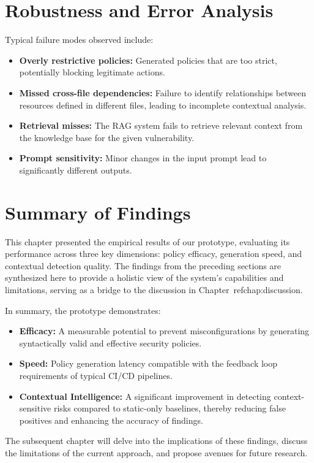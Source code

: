 \section{Robustness and Error Analysis}\label{sec:robustness-error}

Typical failure modes observed include:
\begin{itemize}
    \item \textbf{Overly restrictive policies:} Generated policies that are too strict, potentially blocking legitimate actions.
    \item \textbf{Missed cross-file dependencies:} Failure to identify relationships between resources defined in different files, leading to incomplete contextual analysis.
    \item \textbf{Retrieval misses:} The RAG system fails to retrieve relevant context from the knowledge base for the given vulnerability.
    \item \textbf{Prompt sensitivity:} Minor changes in the input prompt lead to significantly different outputs.
\end{itemize}

\section{Summary of Findings}\label{sec:summary-findings}

This chapter presented the empirical results of our prototype, evaluating its performance across three key dimensions: policy efficacy, generation speed, and contextual detection quality. The findings from the preceding sections are synthesized here to provide a holistic view of the system's capabilities and limitations, serving as a bridge to the discussion in Chapter~ref{chap:discussion}.

In summary, the prototype demonstrates:
\begin{itemize}
    \item \textbf{Efficacy:} A measurable potential to prevent misconfigurations by generating syntactically valid and effective security policies.
    \item \textbf{Speed:} Policy generation latency compatible with the feedback loop requirements of typical CI/CD pipelines.
    \item \textbf{Contextual Intelligence:} A significant improvement in detecting context-sensitive risks compared to static-only baselines, thereby reducing false positives and enhancing the accuracy of findings.
\end{itemize}

The subsequent chapter will delve into the implications of these findings, discuss the limitations of the current approach, and propose avenues for future research.
